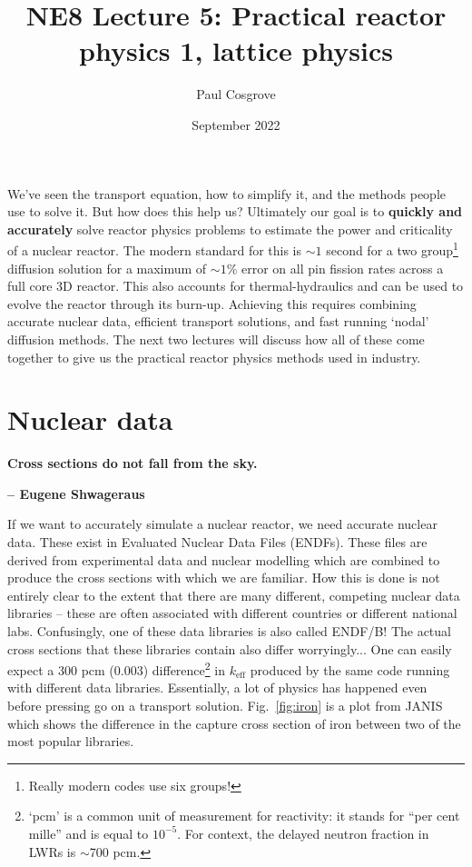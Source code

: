 \documentclass{article}
\title{NE8 Lecture 5: Practical reactor physics 1, lattice physics}
\author{Paul Cosgrove}
\date{September 2022}
\begin{document}
\maketitle

We've seen the transport equation, how to simplify it, and the methods people use to solve it. But how does this help us? Ultimately our goal is to \textbf{quickly and accurately} solve reactor physics problems to estimate the power and criticality of a nuclear reactor. The modern standard for this is $\sim 1$ second for a two group\footnote{Really modern codes use six groups!} diffusion solution for a maximum of $\sim 1$\% error on all pin fission rates across a full core 3D reactor. This also accounts for thermal-hydraulics and can be used to evolve the reactor through its burn-up. Achieving this requires combining accurate nuclear data, efficient transport solutions, and fast running `nodal' diffusion methods. The next two lectures will discuss how all of these come together to give us the practical reactor physics methods used in industry.

\section{Nuclear data}

\begin{displayquote}
\textbf{Cross sections do not fall from the sky.}

\textbf{-- Eugene Shwageraus}
\end{displayquote}

If we want to accurately simulate a nuclear reactor, we need accurate nuclear data. These exist in Evaluated Nuclear Data Files (ENDFs). These files are derived from experimental data and nuclear modelling which are combined to produce the cross sections with which we are familiar. How this is done is not entirely clear to the extent that there are many different, competing nuclear data libraries -- these are often associated with different countries or different national labs. Confusingly, one of these data libraries is also called ENDF/B! The actual cross sections that these libraries contain also differ worryingly... One can easily expect a 300 pcm (0.003) difference\footnote{`pcm' is a common unit of measurement for reactivity: it stands for ``per cent mille'' and is equal to $10^{-5}$. For context, the delayed neutron fraction in LWRs is $\sim$700 pcm.} in $k_\mathrm{eff}$ produced by the same code running with different data libraries. Essentially, a lot of physics has happened even before pressing go on a transport solution. Fig.~\ref{fig:iron} is a plot from JANIS which shows the difference in the capture cross section of iron between two of the most popular libraries.
\end{document}
